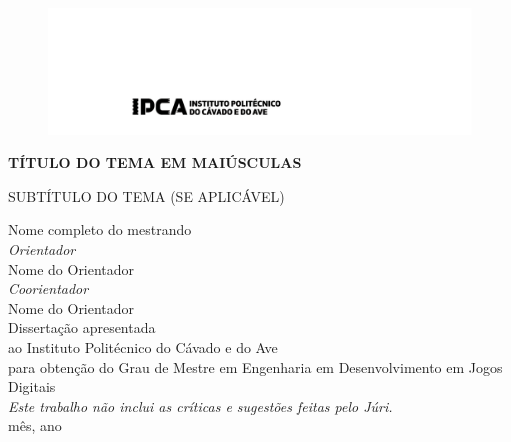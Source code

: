 
\begin{titlepage}
	\clearpage
	\begin{figure}[t!]		
		\vspace*{(-2.54cm -\voffset-\topmargin-\headheight-\headsep)}
		\includegraphics[width=1.00\paperwidth,pagecenter]{Images/FrontCoverInnerLogo.png}
	\end{figure}
	
	
	\begin{flushleft}
		\newcommand\nbvspace[1][3]{\vspace*{\stretch{#1}}}
		\newcommand\nbstretchyspace{\spaceskip0.5em plus 0.25em minus 0.25em}
		\newcommand{\nbtitlestretch}{\spaceskip0.6em}
		\pagestyle{empty}
		
		\bfseries
		\nbvspace[3]		
		{\Large
			TÍTULO DO TEMA EM MAIÚSCULAS}
		
		\mdseries		%
		{\Large SUBTÍTULO DO TEMA (SE APLICÁVEL)}
		
		
		
		\nbvspace[2]
		{\large Nome completo do mestrando } \\[0.6em]
		{\small \emph{ Orientador}} \\[0.2em]
		{\normalsize Nome do Orientador} \\[0.6em]
		{\small \emph{ Coorientador}} \\[0.2em]
		{\normalsize Nome do Orientador}\\[2.0em]
		
		
		
		\small Dissertação apresentada\\
		\small ao Instituto Politécnico do Cávado e do Ave\\
		\small para obtenção do Grau de Mestre em Engenharia em Desenvolvimento em Jogos Digitais \\[2.0em]
		
		{\small \emph{ Este trabalho não inclui as críticas e sugestões feitas pelo Júri.}} \\[3.0em]
		
		
		
		{\normalsize mês, ano }
		\nbvspace[1]
		
	\end{flushleft} 
\end{titlepage}